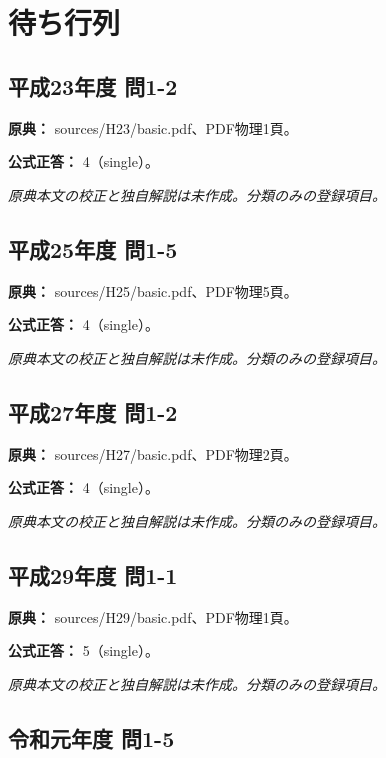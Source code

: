 \section{待ち行列}

\subsection{平成23年度 問1-2}
\label{q:h23-reg-basic-1-2}

\noindent\textbf{原典：} sources/H23/basic.pdf、PDF物理1頁。

\textbf{公式正答：} 4（single）。

\par\textit{原典本文の校正と独自解説は未作成。分類のみの登録項目。}

\subsection{平成25年度 問1-5}
\label{q:h25-reg-basic-1-5}

\noindent\textbf{原典：} sources/H25/basic.pdf、PDF物理5頁。

\textbf{公式正答：} 4（single）。

\par\textit{原典本文の校正と独自解説は未作成。分類のみの登録項目。}

\subsection{平成27年度 問1-2}
\label{q:h27-reg-basic-1-2}

\noindent\textbf{原典：} sources/H27/basic.pdf、PDF物理2頁。

\textbf{公式正答：} 4（single）。

\par\textit{原典本文の校正と独自解説は未作成。分類のみの登録項目。}

\subsection{平成29年度 問1-1}
\label{q:h29-reg-basic-1-1}

\noindent\textbf{原典：} sources/H29/basic.pdf、PDF物理1頁。

\textbf{公式正答：} 5（single）。

\par\textit{原典本文の校正と独自解説は未作成。分類のみの登録項目。}

\subsection{令和元年度 問1-5}
\label{q:r01-reg-basic-1-5}

